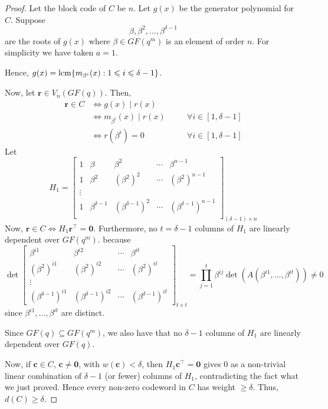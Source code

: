 \begin{proof}
    Let the block code of $ C $ be $ n $. Let $ g(x) $ be
    the generator polynomial for $ C $. Suppose
    \[ \beta,\beta^2,\ldots ,\beta^{\delta-1} \]
    are the roots of $ g(x) $ where $ \beta\in GF(q^m) $
    is an element of order $ n $. For simplicity we have taken
    $ a=1 $.

    Hence, $ g(x)=\operatorname{lcm} \{m_{\beta^i}(x):1\leqslant i\leqslant \delta-1\} $.

    Now, let $ \bm{r}\in V_n(GF(q)) $. Then,
    \[ \begin{aligned}
            \bm{r}\in C
             & \iff g(x)\mid r(x)                                              \\
             & \iff m_{\beta^i}(x)\mid r(x) & \quad & \forall i\in[1,\delta-1] \\
             & \iff r(\beta^i)=0            & \quad & \forall i\in[1,\delta-1]
        \end{aligned} \]
    Let
    \[ H_1=
        \begin{bmatrix}
            1 & \beta            & \beta^2              & \cdots & \beta^{n-1}              \\
            1 & \beta^2          & (\beta^2)^2          & \cdots & (\beta^2)^{n-1}          \\
            \vdots                                                                          \\
            1 & \beta^{\delta-1} & (\beta^{\delta-1})^2 & \cdots & (\beta^{\delta-1})^{n-1} \\
        \end{bmatrix}_{(\delta-1)\times n} \]
    Now, $ \bm{r}\in C\iff H_1\bm{r}^\top=\bm{0} $. Furthermore, no $ t=\delta-1 $
    columns of $ H_1 $ are linearly dependent over $ GF(q^m) $.
    because
    \[ \det
        \begin{bmatrix}
            \beta^{i1}              & \beta^{i2}              & \cdots & \beta^{it}              \\
            (\beta^2)^{i1}          & (\beta^2)^{i2}          & \cdots & (\beta^2)^{it}          \\
            \vdots                                                                               \\
            (\beta^{\delta-1})^{i1} & (\beta^{\delta-1})^{i2} & \cdots & (\beta^{\delta-1})^{it}
        \end{bmatrix}_{t\times t}=\prod_{j=1}^t\beta^{ij}\det(A(\beta^{i1},\ldots,\beta^{it}))\neq 0 \]
    since $ \beta^{i1},\ldots ,\beta^{it} $ are distinct.

    Since $ GF(q)\subseteq GF(q^m) $, we also have that no $ \delta-1 $ columns
    of $ H_1 $ are linearly dependent over $ GF(q) $.

    Now, if $ \bm{c}\in C $, $ \bm{c}\neq \bm{0} $, with $ w(\bm{c})<\delta $,
    then $ H_1\bm{c}^\top=\bm{0} $ gives $ 0 $ as a non-trivial
    linear combination of $ \delta-1 $ (or fewer) columns of $ H_1 $,
    contradicting the fact what we just proved. Hence every
    non-zero codeword in $ C $ has weight $ \geqslant \delta $.
    Thus, $ d(C)\geqslant \delta $.
\end{proof}
